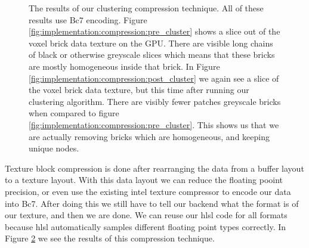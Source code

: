 \begin{figure}[H]
    \centering
    \hfill
    \hfill
    \caption{The results of our clustering compression technique. All of these results use Bc7 encoding. Figure \ref{fig:implementation:compression:pre_cluster} shows a slice out of the voxel brick data texture on the GPU. There are visible long chains of black or otherwise greyscale slices which means that these bricks are mostly homogeneous inside that brick. In Figure \ref{fig:implementation:compression:post_cluster} we again see a slice of the voxel brick data texture, but this time after running our clustering algorithm. There are visibly fewer patches greyscale bricks when compared to figure \ref{fig:implementation:compression:pre_cluster}. This shows us that we are actually removing bricks which are homogeneous, and keeping unique nodes.} \label{fig:implementation:compression:cluster}
\end{figure}


\noindent
Texture block compression is done after rearranging the data from a buffer layout to a texture layout. With this data layout we can reduce the floating pooint precision, or even use the existing intel texture compressor \cite{ISPCTextureCompressor} to encode our data into Bc7. After doing this we still have to tell our backend what the format is of our texture, and then we are done. We can reuse our hlsl code for all formats because hlsl automatically samples different floating point types correctly.  In Figure \ref{fig:implementation:compression:bc} we see the results of this compression technique.

\begin{figure}[H]
    \centering

    \caption{} \label{fig:implementation:compression:bc}
\end{figure}


